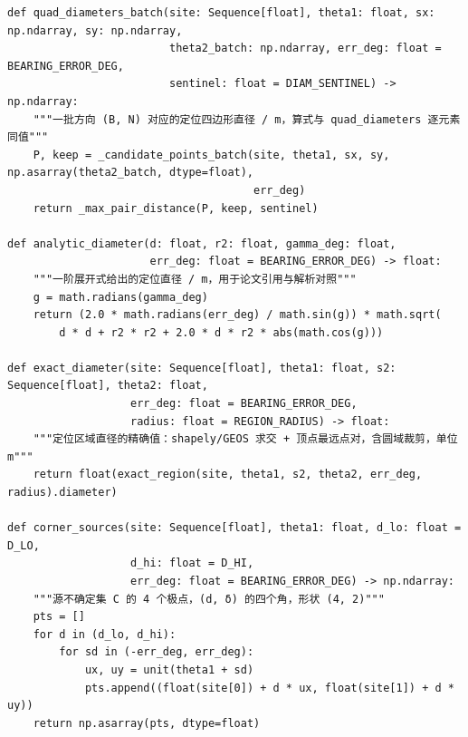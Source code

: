 \documentclass[UTF8, zihao=5,AutoFakeBold=2]{ctexart}
\begin{document}
\begin{lstlisting}
def quad_diameters_batch(site: Sequence[float], theta1: float, sx: np.ndarray, sy: np.ndarray,
                         theta2_batch: np.ndarray, err_deg: float = BEARING_ERROR_DEG,
                         sentinel: float = DIAM_SENTINEL) -> np.ndarray:
    """一批方向 (B, N) 对应的定位四边形直径 / m，算式与 quad_diameters 逐元素同值"""
    P, keep = _candidate_points_batch(site, theta1, sx, sy, np.asarray(theta2_batch, dtype=float),
                                      err_deg)
    return _max_pair_distance(P, keep, sentinel)

def analytic_diameter(d: float, r2: float, gamma_deg: float,
                      err_deg: float = BEARING_ERROR_DEG) -> float:
    """一阶展开式给出的定位直径 / m，用于论文引用与解析对照"""
    g = math.radians(gamma_deg)
    return (2.0 * math.radians(err_deg) / math.sin(g)) * math.sqrt(
        d * d + r2 * r2 + 2.0 * d * r2 * abs(math.cos(g)))

def exact_diameter(site: Sequence[float], theta1: float, s2: Sequence[float], theta2: float,
                   err_deg: float = BEARING_ERROR_DEG,
                   radius: float = REGION_RADIUS) -> float:
    """定位区域直径的精确值：shapely/GEOS 求交 + 顶点最远点对，含圆域裁剪，单位 m"""
    return float(exact_region(site, theta1, s2, theta2, err_deg, radius).diameter)

def corner_sources(site: Sequence[float], theta1: float, d_lo: float = D_LO,
                   d_hi: float = D_HI,
                   err_deg: float = BEARING_ERROR_DEG) -> np.ndarray:
    """源不确定集 C 的 4 个极点，(d, δ) 的四个角，形状 (4, 2)"""
    pts = []
    for d in (d_lo, d_hi):
        for sd in (-err_deg, err_deg):
            ux, uy = unit(theta1 + sd)
            pts.append((float(site[0]) + d * ux, float(site[1]) + d * uy))
    return np.asarray(pts, dtype=float)
	\end{lstlisting}
\end{document}
